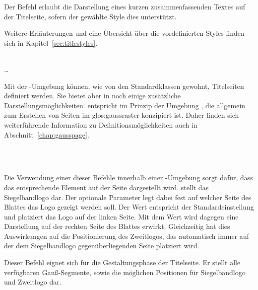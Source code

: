 Der Befehl  erlaubt die Darstellung eines kurzen
zusammenfassenden Textes auf der Titelseite, sofern der gewählte Style
dies unterstützt.

Weitere Erläuterungen und eine Übersicht über die vordefinierten Styles
finden sich in Kapitel~\ref{sec:titlestyles}.


\begin{Declaration}
  \\
  \quad\dots\\
\end{Declaration}

Mit der -Umgebung können, wie von den Standardklassen
gewohnt, Titelseiten definiert werden. Sie bietet aber in \tubslatex noch einige
zusätzliche Darstellungsmöglichkeiten.  entspricht
im Prinzip der Umgebung , die allgemein zum Erstellen
von Seiten im \gls{glos:gaussraster} konzipiert ist. Daher finden sich
weiterführende Information zu Definitionsmöglichkeiten auch in
Abschnitt~\ref{chap:gausspage}.

\begin{Declaration}
  \\
  \\
\end{Declaration}

Die Verwendung einer dieser Befehle innerhalb einer -Umgebung
sorgt dafür, dass das entsprechende Element auf der Seite dargestellt wird.
 stellt das Siegelbandlogo dar. Der optionale Parameter
 legt dabei fest auf welcher Seite des Blattes
das Logo gezeigt werden soll.
Der Wert  entspricht der Standardeinstellung und platziert das Logo auf der linken Seite.
Mit dem Wert  wird dagegen eine Darstellung auf der rechten
Seite des Blattes erwirkt. Gleichzeitig hat dies Auswirkungen
auf die Positionierung des Zweitlogos, das automatisch immer auf der 
dem Siegelbandlogo gegenüberliegenden Seite platziert wird.

\begin{Declaration}
\end{Declaration}

Dieser Befehl eignet sich für die Gestaltungsphase der Titelseite.
Er stellt alle verfügbaren Gauß-Segmente, sowie die möglichen Positionen
für Siegelbandlogo und Zweitlogo dar.

